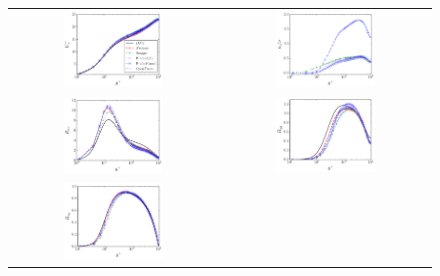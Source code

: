 \documentclass[a4paper]{article}
\begin{document}
\begin{figure}
\begin{tabular}{cc}
\includegraphics[width=0.5\textwidth]{./coarser/um.pdf} &
\includegraphics[width=0.5\textwidth]{./coarser/nu.pdf} \\
\includegraphics[width=0.5\textwidth]{./coarser/rxx.pdf} &
\includegraphics[width=0.5\textwidth]{./coarser/ryy.pdf} \\
\includegraphics[width=0.5\textwidth]{./coarser/rxy.pdf} &

\end{tabular}
\end{figure}
\end{document}
